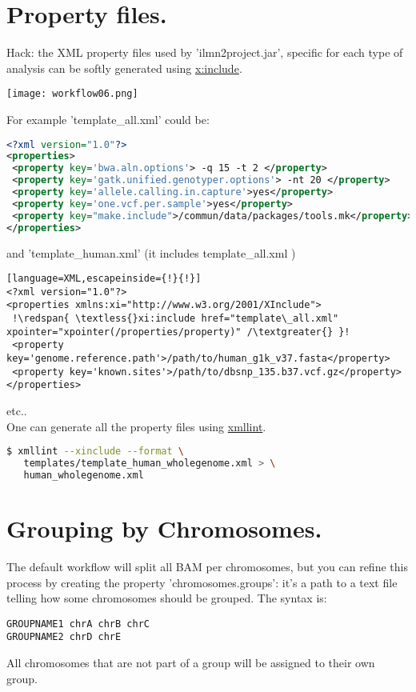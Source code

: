 \documentclass{article}
\newcommand{\redspan}[1]{\textcolor{red}{#1}}
\begin{document}
\section{Property files.}
Hack: the XML property files used by 'ilmn2project.jar', specific for each type of analysis can be softly generated using \href{http://www.w3.org/TR/xinclude/}{x:include}.
\begin{center}
\texttt{[image: workflow06.png]}
\end{center}
For example 'template\_all.xml' could be:
\begin{lstlisting}[language=XML]
<?xml version="1.0"?>
<properties>
 <property key='bwa.aln.options'> -q 15 -t 2 </property>
 <property key='gatk.unified.genotyper.options'> -nt 20 </property>
 <property key='allele.calling.in.capture'>yes</property>
 <property key='one.vcf.per.sample'>yes</property>
 <property key="make.include">/commun/data/packages/tools.mk</property>
</properties>
\end{lstlisting}
and 'template\_human.xml' (it includes template\_all.xml )
\begin{lstlisting}[language=XML,escapeinside={!}{!}]
<?xml version="1.0"?>
<properties xmlns:xi="http://www.w3.org/2001/XInclude">
 !\redspan{ \textless{}xi:include href="template\_all.xml" xpointer="xpointer(/properties/property)" /\textgreater{} }!
 <property key='genome.reference.path'>/path/to/human_g1k_v37.fasta</property>
 <property key='known.sites'>/path/to/dbsnp_135.b37.vcf.gz</property>
</properties>
\end{lstlisting}
etc..\\
One can generate all the property files using \href{http://xmlsoft.org/xmllint.html}{xmllint}.
\begin{lstlisting}[language=bash]
$ xmllint --xinclude --format \
   templates/template_human_wholegenome.xml > \
   human_wholegenome.xml
\end{lstlisting} 


\section{Grouping by Chromosomes.}
The default workflow will split all BAM per chromosomes, but you can refine this process by creating the property 'chromosomes.groups': it's a path to a text file telling how some chromosomes should be grouped. The syntax is:
\begin{lstlisting}
GROUPNAME1 chrA chrB chrC
GROUPNAME2 chrD chrE
\end{lstlisting} 
All chromosomes that are not part of a group will be assigned to their own group.
\end{document}

